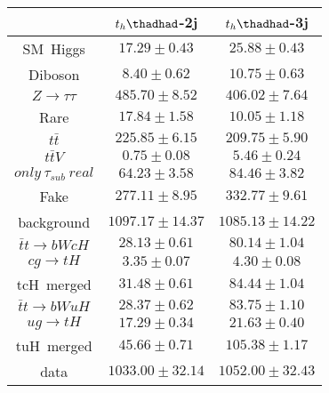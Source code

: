 \centering
\begin{tabular}{ccc}\toprule\toprule
 & $t_{h}\thadhad$-2j                      & $t_{h}\thadhad$-3j \\\midrule
\hspace{9mm}SM~Higgs              & $17.29\pm0.43$                  & $25.88\pm0.43$     \\
\hspace{9mm}Diboson               & $8.40\pm0.62$                    & $10.75\pm0.63$     \\
\hspace{9mm}$Z\to\tau\tau$        & $485.70\pm8.52$           & $406.02\pm7.64$    \\
\hspace{9mm}Rare                  & $17.84\pm1.58$                      & $10.05\pm1.18$     \\
\hspace{9mm}$t\bar{t}$            & $225.85\pm6.15$               & $209.75\pm5.90$    \\
\hspace{9mm}$t\bar{t}V$           & $0.75\pm0.08$                & $5.46\pm0.24$      \\
\hspace{9mm}$only~\tau_{sub}~real$& $64.23\pm3.58$    & $84.46\pm3.82$     \\
\hspace{9mm}Fake                  & $277.11\pm8.95$                     & $332.77\pm9.61$    \\
background            & $1097.17\pm14.37$             & $1085.13\pm14.22$  \\\midrule
\hspace{9mm}$\bar{t}t\to bWcH$    & $28.13\pm0.61$        & $80.14\pm1.04$     \\
\hspace{9mm}$cg\to tH$            & $3.35\pm0.07$                 & $4.30\pm0.08$      \\
tcH~merged            & $31.48\pm0.61$                & $84.44\pm1.04$     \\
\hspace{9mm}$\bar{t}t\to bWuH$    & $28.37\pm0.62$        & $83.75\pm1.10$     \\
\hspace{9mm}$ug\to tH$            & $17.29\pm0.34$                & $21.63\pm0.40$     \\
tuH~merged            & $45.66\pm0.71$                & $105.38\pm1.17$    \\\midrule
data                  & $1033.00\pm32.14$                   & $1052.00\pm32.43$  \\
\bottomrule\bottomrule
\end{tabular}